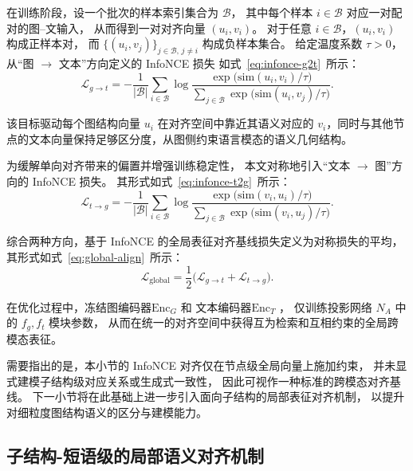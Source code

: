 在训练阶段，设一个批次的样本索引集合为 $\mathcal{B}$，
其中每个样本 $i\in\mathcal{B}$ 对应一对配对的图--文输入，
从而得到一对对齐向量 $(u_i, v_i)$。
对于任意 $i\in\mathcal{B}$，$(u_i, v_i)$ 构成正样本对，
而 $\{(u_i, v_j)\}_{j\in\mathcal{B},\,j\neq i}$ 构成负样本集合。
给定温度系数 \(\tau > 0\)，从“图 \(\rightarrow\) 文本”方向定义的 InfoNCE 损失
如式~\ref{eq:infonce-g2t}\ 所示：
\begin{equation}
  \mathcal{L}_{g \rightarrow t}
  =
  - \frac{1}{|\mathcal{B}|}
    \sum_{i \in \mathcal{B}}
    \log
    \frac{\exp\bigl(\mathrm{sim}(u_i, v_i) / \tau\bigr)}
         {\sum_{j \in \mathcal{B}} \exp\bigl(\mathrm{sim}(u_i, v_j) / \tau\bigr)}.
  \label{eq:infonce-g2t}
\end{equation}

该目标驱动每个图结构向量 \(u_i\) 在对齐空间中靠近其语义对应的 \(v_i\)，同时与其他节点的文本向量保持足够区分度，从图侧约束语言模态的语义几何结构。

为缓解单向对齐带来的偏置并增强训练稳定性，
本文对称地引入“文本 \(\rightarrow\) 图”方向的 InfoNCE 损失。
其形式如式~\ref{eq:infonce-t2g}\ 所示：
\begin{equation}
  \mathcal{L}_{t \rightarrow g}
  =
  - \frac{1}{|\mathcal{B}|}
    \sum_{i \in \mathcal{B}}
    \log
    \frac{\exp\bigl(\mathrm{sim}(v_i, u_i) / \tau\bigr)}
         {\sum_{j \in \mathcal{B}} \exp\bigl(\mathrm{sim}(v_i, u_j) / \tau\bigr)}.
  \label{eq:infonce-t2g}
\end{equation}

综合两种方向，基于 InfoNCE 的全局表征对齐基线损失定义为对称损失的平均，
其形式如式~\ref{eq:global-align}\ 所示：
\begin{equation}
  \mathcal{L}_{\mathrm{global}}
  =
  \frac{1}{2}
  \bigl(
    \mathcal{L}_{g \rightarrow t}
    +
    \mathcal{L}_{t \rightarrow g}
  \bigr).
  \label{eq:global-align}
\end{equation}

在优化过程中，冻结图编码器\(\mathrm{Enc}_G\) 和
文本编码器\(\mathrm{Enc}_T\) ，
仅训练投影网络 \(N_A\) 中的 \(f_g, f_t\) 模块参数，
从而在统一的对齐空间中获得互为检索和互相约束的全局跨模态表征。

需要指出的是，本小节的 InfoNCE 对齐仅在节点级全局向量上施加约束，
并未显式建模子结构级对应关系或生成式一致性，
因此可视作一种标准的跨模态对齐基线。
下一小节将在此基础上进一步引入面向子结构的局部表征对齐机制，
以提升对细粒度图结构语义的区分与建模能力。



\subsection{子结构-短语级的局部语义对齐机制}
\label{subsec:local_align}


